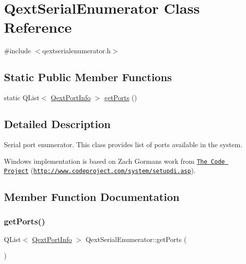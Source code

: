 \hypertarget{class_qext_serial_enumerator}{}\section{Qext\+Serial\+Enumerator Class Reference}
\label{class_qext_serial_enumerator}


{\ttfamily \#include $<$qextserialenumerator.\+h$>$}

\subsection*{Static Public Member Functions}
\begin{DoxyCompactItemize}
\item 
static Q\+List$<$ \mbox{\hyperlink{struct_qext_port_info}{Qext\+Port\+Info}} $>$ \mbox{\hyperlink{class_qext_serial_enumerator_a7b0e5f76259ae0651ea23763decc2642}{get\+Ports}} ()
\end{DoxyCompactItemize}


\subsection{Detailed Description}
Serial port enumerator. This class provides list of ports available in the system.

Windows implementation is based on Zach Gorman\textquotesingle{}s work from \href{http://www.codeproject.com}{\tt The Code Project} (\href{http://www.codeproject.com/system/setupdi.asp}{\tt http\+://www.\+codeproject.\+com/system/setupdi.\+asp}). 

\subsection{Member Function Documentation}
\mbox{\label{class_qext_serial_enumerator_a7b0e5f76259ae0651ea23763decc2642}} 
\subsubsection{\texorpdfstring{get\+Ports()}{getPorts()}}
{\footnotesize\ttfamily Q\+List$<$ \mbox{\hyperlink{struct_qext_port_info}{Qext\+Port\+Info}} $>$ Qext\+Serial\+Enumerator\+::get\+Ports (\begin{DoxyParamCaption}{ }\end{DoxyParamCaption})\hspace{0.3cm}{\ttfamily [static]}}

